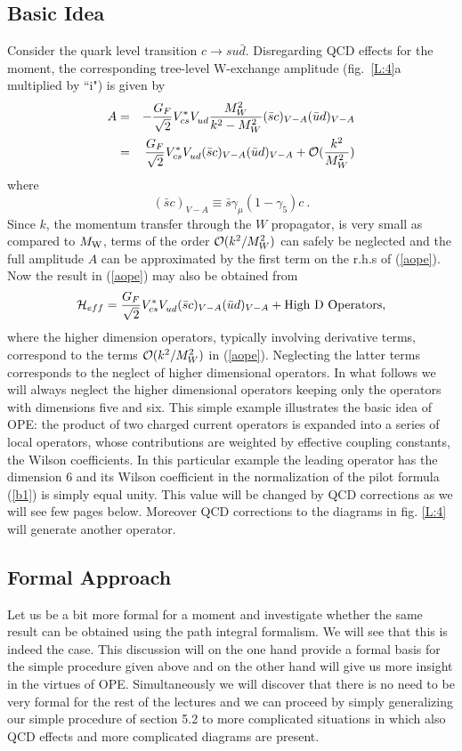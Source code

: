 \documentclass[12pt,rotate]{article}
\newcommand{\mw}{M_{\rm W}}
\newcommand{\be}{\begin{equation}}
\newcommand{\ee}{\end{equation}}
\newcommand{\ord}{{\cal O}}
\def\gf{\gamma_5}
\begin{document}
\begin{itemize}
\begin{itemize}
\subsection{Basic Idea}
Consider 
the quark level transition  $c\to su\bar d$.
Disregarding QCD effects for the moment,  the corresponding
tree-level W-exchange
amplitude (fig.~\ref{L:4}a multiplied by ``i") is given by
\begin{eqnarray}\label{aope}
A&=&-{G_F\over\sqrt{2}}V^*_{cs}V_{ud}^{}{M^2_W\over k^2-M^2_W}
  (\bar sc)_{V-A}(\bar ud)_{V-A} \nonumber\\
 &=& {G_F\over\sqrt{2}}V^*_{cs}V_{ud}^{}
  (\bar sc)_{V-A}(\bar ud)_{V-A} + \ord({k^2\over M^2_W})
\end{eqnarray}
where 
\be
(\bar sc)_{V-A}\equiv
\bar s\gamma_{\mu} (1-\gf)c~.
\ee
Since $k$, the momentum transfer through the $W$ propagator, is very
small as compared to $\mw$, terms of the order $\ord({k^2/M^2_W})$
can safely be neglected and the full amplitude $A$ can be approximated
by the first term on the r.h.s of (\ref{aope}).
Now the result in (\ref{aope}) may  also be obtained from 
\begin{equation}\label{hc0}
{\cal H}_{eff}={G_F\over\sqrt{2}}V^*_{cs}V_{ud}^{}
  (\bar sc)_{V-A}(\bar ud)_{V-A} + {\rm High~ D~ Operators},
  \end{equation}
 where the higher dimension operators, typically involving derivative
terms, correspond to the terms $\ord({k^2/M^2_W})$ in (\ref{aope}).
Neglecting the latter terms corresponds to the neglect of higher
dimensional operators. In what follows we will always neglect 
the higher dimensional operators keeping only the operators with
dimensions five
and six.
This
 simple example illustrates the basic idea of  OPE:
the product of two charged current
operators is expanded into a series of local operators,
whose contributions are weighted by effective coupling constants,
the Wilson coefficients. In this particular example the leading
operator has the dimension 6 and its Wilson coefficient in the
normalization of the pilot formula (\ref{b1}) is simply equal
unity. This value will be changed by QCD corrections as we will
see few pages below. Moreover QCD corrections to the diagrams in
fig. \ref{L:4} will generate another operator.

\subsection{Formal Approach}
Let us be a bit more formal for a moment and investigate whether
the same result can be obtained using the path integral formalism.
We will see that this is indeed the case. This discussion will
on the one hand provide a formal basis for the simple procedure
given above and on the other hand will give us more insight
in the virtues of OPE. Simultaneously we will discover that
there is no need to be very formal for the rest of the lectures
and we can proceed by simply generalizing our simple procedure
of section 5.2 to more complicated situations in which also QCD 
effects and more complicated diagrams are
present. 


\end{itemize}
\end{itemize}
\end{document}
